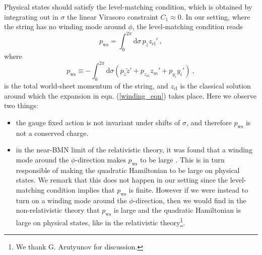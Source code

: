 \documentclass[12pt]{article}
\def\dd{\text{d}}
\numberwithin{equation}{section}
\begin{document}
Physical states should satisfy the level-matching condition, which is obtained by integrating out in $\sigma$ the linear Virasoro constraint $C_1  \approx  0$.  In our setting, where the string has no winding mode around $\phi$, the level-matching condition reads
\begin{equation}
p_{\text{ws}} =  \int_0^{2\pi} \dd \sigma \, p_{\tilde{z}} z_{\text{cl}}'\ , 
\end{equation} 
where
\begin{equation}
p_{\text{ws}} \equiv -\int_0^{2\pi} \dd \sigma ( p_{\tilde{z}} \tilde{z}' + p_{z_m}z_m' + p_{y_i}y_i' ) \ ,
\end{equation}
is the total world-sheet momentum of the string, and $z_{\text{cl}}$ is the classical solution around which the expansion in eqn. (\ref{winding_eqn}) takes place. Here we observe two things:
\begin{itemize}
\item the gauge fixed action is not invariant under shifts of $\sigma$, and therefore $p_{\text{ws}}$ is not a conserved charge. 
\item in the near-BMN limit of the relativistic theory, it was found that a winding mode around the $\phi$-direction makes $p_{\text{ws}}$ to be large \cite{Arutyunov:2004yx}.  This is in turn responsible of making the quadratic Hamiltonian to be large on physical states.  We remark that this does not happen in our setting since the level-matching condition implies that $p_{\text{ws}}$ is finite.  However if we were instead to turn on a winding mode around the $\phi$-direction, then we would find in the non-relativistic theory that $p_{\text{ws}}$ is large and the quadratic Hamiltonian is large on physical states,  like in the relativistic theory\footnote{We thank G.  Arutyunov for discussion.}.
\end{itemize}
\end{document}
